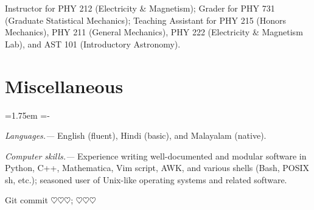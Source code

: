 \documentclass[10pt,a4paper,article,oneside]{memoir}
\def\email#1{\href{mailto:#1}{#1}}
\def\hangpars{%
  \leftskip=1.75em%
  \parindent=-\leftskip%
  \setsecindent{-\leftskip}%
  \setsubsecindent{-\leftskip}%
}
\def\gitError{$\heartsuit\heartsuit\heartsuit$}
\def\gitHash{\gitError}
\def\gitShortHash{\gitError}
\def\gitCommitterDate{\gitError}
\begin{document}
Instructor for PHY 212 (Electricity \& Magnetism); Grader for PHY 731 (Graduate Statistical Mechanics); Teaching Assistant for PHY 215 (Honors Mechanics), PHY 211 (General Mechanics), PHY 222 (Electricity \& Magnetism Lab), and AST 101 (Introductory Astronomy).


\section{Miscellaneous}

\hangpars

\emph{Languages.---} English (fluent), Hindi (basic), and Malayalam (native).

\emph{Computer skills.---} Experience writing well-documented and modular software in Python, C++, Mathematica, Vim script, AWK, and various shells (Bash, POSIX sh, etc.); seasoned user of Unix-like operating systems and related software.


%


\bigskip

\begin{center}
  \color{gray}
  Git commit \href{https://github.com/manu-mannattil/vitae/tree/\gitHash}{\texttt{\gitShortHash}}; \gitCommitterDate
\end{center}
\end{document}
